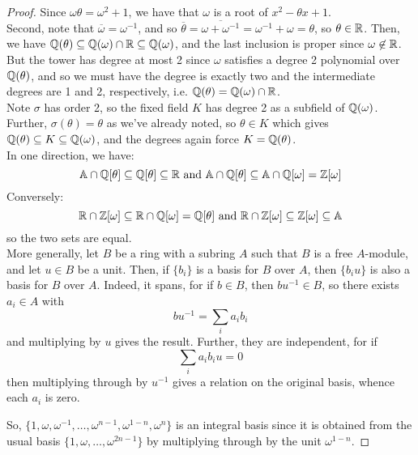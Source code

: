 \begin{proof} 
    Since $\omega\theta = \omega^2 + 1$, we have that $\omega$ is a root of $x^2 - \theta x + 1$. \\

    Second, note that $\overline{\omega} = \omega^{-1}$, and so $\overline{\theta} = \overline{\omega+\omega^{-1}} = \omega^{-1}+\omega = \theta$, so $\theta \in \mathbb{R}$. Then, we have $\mathbb{Q}(\theta) \subseteq \mathbb{Q}(\omega) \cap \mathbb{R} \subseteq \mathbb{Q}(\omega)$, and the last inclusion is proper since $\omega \not\in \mathbb{R}$. But the tower has degree at most 2 since $\omega$ satisfies a degree 2 polynomial over $\mathbb{Q}(\theta)$, and so we must have the degree is exactly two and the intermediate degrees are 1 and 2, respectively, i.e. $\mathbb{Q}(\theta) = \mathbb{Q}(\omega) \cap \mathbb{R}$. \\

    Note $\sigma$ has order 2, so the fixed field $K$ has degree 2 as a subfield of $\mathbb{Q}(\omega)$. Further, $\sigma(\theta) = \theta$ as we've already noted, so $\theta \in K$ which gives $\mathbb{Q}(\theta) \subseteq K \subseteq \mathbb{Q}(\omega)$, and the degrees again force $K = \mathbb{Q}(\theta)$. \\

    In one direction, we have:
    \[ \mathbb{A} \cap \mathbb{Q}[\theta] \subseteq \mathbb{Q}[\theta] \subseteq \mathbb{R} \text{ and } \mathbb{A} \cap \mathbb{Q}[\theta] \subseteq \mathbb{A} \cap \mathbb{Q}[\omega] = \mathbb{Z}[\omega] \]
    Conversely:
    \[ \mathbb{R} \cap \mathbb{Z}[\omega] \subseteq \mathbb{R} \cap \mathbb{Q}[\omega] = \mathbb{Q}[\theta] \text{ and } \mathbb{R} \cap \mathbb{Z}[\omega] \subseteq \mathbb{Z}[\omega] \subseteq \mathbb{A} \]
    so the two sets are equal. \\

    More generally, let $B$ be a ring with a subring $A$ such that $B$ is a free $A$-module, and let $u \in B$ be a unit. Then, if $\{b_i\}$ is a basis for $B$ over $A$, then $\{b_iu\}$ is also a basis for $B$ over $A$. Indeed, it spans, for if $b \in B$, then $bu^{-1} \in B$, so there exists $a_i \in A$ with
    \[ bu^{-1} = \sum_i a_ib_i \]
    and multiplying by $u$ gives the result. Further, they are independent, for if
    \[ \sum_i a_ib_iu = 0 \]
    then multiplying through by $u^{-1}$ gives a relation on the original basis, whence each $a_i$ is zero.

    So, $\{1,\omega,\omega^{-1},\ldots,\omega^{n-1},\omega^{1-n},\omega^n\}$ is an integral basis since it is obtained from the usual basis $\{1,\omega,\ldots,\omega^{2n-1}\}$ by multiplying through by the unit $\omega^{1-n}$.


\end{proof}

